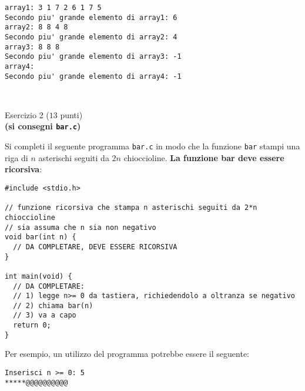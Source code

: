 \documentclass[12pt]{article}
\begin{document}
\begin{mdframed}[backgroundcolor=lightgrey] 
\begin{verbatim}
array1: 3 1 7 2 6 1 7 5 
Secondo piu' grande elemento di array1: 6
array2: 8 8 4 8 
Secondo piu' grande elemento di array2: 4
array3: 8 8 8 
Secondo piu' grande elemento di array3: -1
array4: 
Secondo piu' grande elemento di array4: -1
\end{verbatim}
\end{mdframed}

\mbox{}\\
\begin{center}{\Large Esercizio 2} ($13$ punti)\\
  \textbf{(si consegni \texttt{bar.c})}\end{center}
%
Si completi il seguente programma \texttt{bar.c} in modo che la funzione
\texttt{bar} stampi una riga di $n$ asterischi seguiti da
$2n$ chioccioline. \textbf{La funzione bar deve essere ricorsiva}:

\begin{center}
  \begin{lstlisting}[language=myC]
#include <stdio.h>

// funzione ricorsiva che stampa n asterischi seguiti da 2*n chioccioline
// sia assuma che n sia non negativo
void bar(int n) {
  // DA COMPLETARE, DEVE ESSERE RICORSIVA
}

int main(void) {
  // DA COMPLETARE:
  // 1) legge n>= 0 da tastiera, richiedendolo a oltranza se negativo
  // 2) chiama bar(n)
  // 3) va a capo
  return 0;
}
  \end{lstlisting}
\end{center}

Per esempio, un utilizzo del programma potrebbe essere il seguente:

\begin{mdframed}[backgroundcolor=lightgrey] 
\begin{verbatim}
Inserisci n >= 0: 5
*****@@@@@@@@@@
\end{verbatim}
\end{mdframed}
\end{document}
